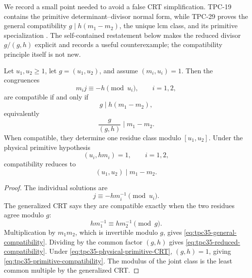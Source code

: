 We record a small point needed to avoid a false CRT simplification.
TPC-19 contains the primitive determinant--divisor normal form, while
TPC-29 proves the general compatibility \(g\mid h(m_1-m_2)\), the unique
lcm class, and its primitive specialization
\citep{WangTPC19,WangTPC29}.  The self-contained restatement below makes
the reduced divisor \(g/(g,h)\) explicit and records a useful
counterexample; the compatibility principle itself is not new.

\begin{proposition}
\label{prop:tpc35-affine-CRT-compatibility}
Let \(u_1,u_2\ge1\), let \(g=(u_1,u_2)\), and assume
\((m_i,u_i)=1\).  Then the congruences
\begin{equation}
 m_i j\equiv-h\pmod{u_i},\qquad i=1,2,
 \label{eq:tpc35-two-congruences}
\end{equation}
are compatible if and only if
\begin{equation}
 \boxed{g\mid h(m_1-m_2),}
 \label{eq:tpc35-general-compatibility}
\end{equation}
equivalently
\begin{equation}
 \frac{g}{(g,h)}\mid m_1-m_2.
 \label{eq:tpc35-reduced-compatibility}
\end{equation}
When compatible, they determine one residue class modulo
\([u_1,u_2]\).  Under the physical primitive hypothesis
\begin{equation}
 (u_i,hm_i)=1,\qquad i=1,2,
 \label{eq:tpc35-physical-primitive-CRT}
\end{equation}
compatibility reduces to
\begin{equation}
 \boxed{(u_1,u_2)\mid m_1-m_2.}
 \label{eq:tpc35-primitive-compatibility}
\end{equation}
\end{proposition}

\begin{proof}
The individual solutions are
\[
 j\equiv-hm_i^{-1}\pmod{u_i}.
\]
The generalized CRT says they are compatible exactly when the two
residues agree modulo \(g\):
\[
 hm_1^{-1}\equiv hm_2^{-1}\pmod g.
\]
Multiplication by \(m_1m_2\), which is invertible modulo \(g\), gives
\eqref{eq:tpc35-general-compatibility}.  Dividing by the common factor
\((g,h)\) gives \eqref{eq:tpc35-reduced-compatibility}.  Under
\eqref{eq:tpc35-physical-primitive-CRT}, \((g,h)=1\), giving
\eqref{eq:tpc35-primitive-compatibility}.  The modulus of the joint class
is the least common multiple by the generalized CRT.
\end{proof}

